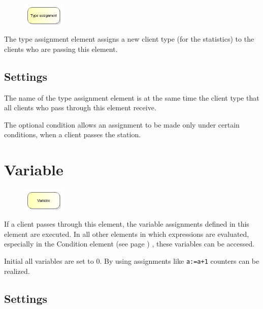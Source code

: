 \begin{figure}
\vspace{-22pt}
\includegraphics[width=2cm]{imageModelElementAssign.png}
\vspace{-22pt}
\end{figure}

The type assignment element assigns a new client type (for the statistics) to the clients who are passing this element.

\subsection*{Settings}

The name of the type assignment element is at the same time the client type that all clients who pass through this element receive.

The optional condition allows an assignment to be made only under certain conditions,
when a client passes the station.


\section{Variable}
\label{ref:ModelElementSet}

\begin{figure}
\vspace{-22pt}
\includegraphics[width=2cm]{imageModelElementSet.png}
\vspace{-22pt}
\end{figure}

If a client passes through this element, the variable assignments defined in
this element are executed. In all other elements in which expressions are evaluated,
especially in the Condition element (see page \pageref{ref:ModelElementHold}) , these variables can be accessed.

Initial all variables are set to 0. By using assignments like \texttt{a:=a+1} counters can be realized.

\subsection*{Settings}

